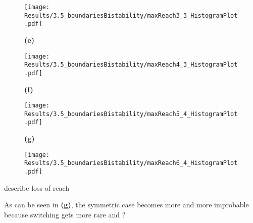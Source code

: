 \begin{figure}[htpb!]
\begin{minipage}{0.77\textwidth}
\begin{minipage}{0.1\textwidth}
                \end{minipage}
                \begin{minipage}{0.66\textwidth}
                    \texttt{[image: Results/3.5\_boundariesBistability/maxReach3\_3\_HistogramPlot.pdf]}
                \end{minipage}
            \end{minipage}
            \begin{minipage}{0.77\textwidth}
                \begin{minipage}{0.1\textwidth}
                    \caption*{\small \textbf{(e)}}
                \end{minipage}
                \begin{minipage}{0.66\textwidth}
                    \texttt{[image: Results/3.5\_boundariesBistability/maxReach4\_3\_HistogramPlot.pdf]}
                \end{minipage}
            \end{minipage}
            \begin{minipage}{0.77\textwidth}
                \begin{minipage}{0.1\textwidth}
                    \caption*{\small \textbf{(f)}}
                \end{minipage}
                \begin{minipage}{0.66\textwidth}
                    \texttt{[image: Results/3.5\_boundariesBistability/maxReach5\_4\_HistogramPlot.pdf]}
                \end{minipage}
            \end{minipage}
            \begin{minipage}{0.77\textwidth}
                \begin{minipage}{0.1\textwidth}
                    \caption*{\small \textbf{(g)}}
                \end{minipage}
                \begin{minipage}{0.66\textwidth}
                    \texttt{[image: Results/3.5\_boundariesBistability/maxReach6\_4\_HistogramPlot.pdf]}
                \end{minipage}
            \end{minipage}
            \caption{}
            \label{img:enzymeReach}
        \end{figure}
        \begin{itemize}
            {
                \color{red}
                \item describe loss of reach
                \item As can be seen in \textbf{(g)}, the symmetric case becomes more and more improbable because switching gets more rare and ?
            }
        \end{itemize}
    \newpage
